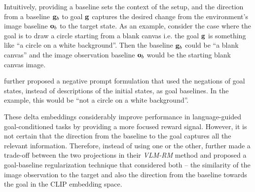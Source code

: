 Intuitively, providing a baseline sets the context of the setup, and the direction from a baseline \(\mathbf{g}_b\) to goal \(\mathbf{g}\) captures the desired change from the environment's image baseline \(\mathbf{o}_b\) to the target state.
As an example, consider the case where the goal is to draw a circle starting from a blank canvas i.e. the goal \(\mathbf{g}\) is something like ``a circle on a white background''.
Then the baseline \(\mathbf{g}_b\) could be ``a blank canvas'' and the image observation baseline \(\mathbf{o}_b\) would be the starting blank canvas image.

\cite{negprompt} further proposed a negative prompt formulation that used the negations of goal states, instead of descriptions of the initial states, as goal baselines.
In the example, this would be ``not a circle on a white background''.

These delta embeddings considerably improve performance in language-guided goal-conditioned tasks by providing a more focused reward signal.
However, it is not certain that the direction from the baseline to the goal captures all the relevant information.
Therefore, instead of using one or the other, \cite{vlmrm} further made a trade-off between the two projections in their \emph{VLM-RM} method and proposed a goal-baseline regularization technique that considered both -- the similarity of the image observation to the target and also the direction from the baseline towards the goal in the CLIP embedding space.

